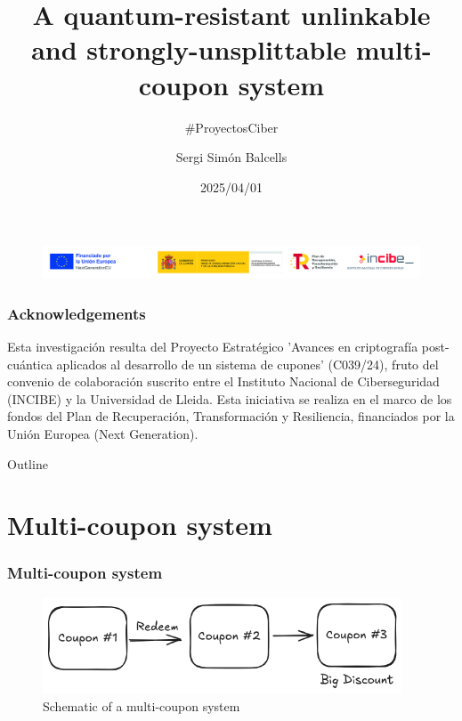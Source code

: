 \documentclass[presentation]{beamer}
\author{Sergi Simón Balcells}
\date{2025/04/01}
\title{A quantum-resistant unlinkable and strongly-unsplittable multi-coupon system}
\subtitle{\#ProyectosCiber}
\newlength\beamerleftmargin
\begin{document}
\begin{frame}
  \titlepage
  \begin{figure}
    \hspace*{-\beamerleftmargin}%
    \includegraphics[width=\paperwidth]{incibe.jpg}
  \end{figure}
\end{frame}

\begin{frame}
  \frametitle{Acknowledgements}
  Esta investigación resulta del Proyecto Estratégico 'Avances
  en criptografía post-cuántica aplicados al desarrollo
  de un sistema de cupones' (C039/24), fruto del convenio
  de colaboración suscrito entre el Instituto Nacional de
  Ciberseguridad (INCIBE) y la Universidad de Lleida. Esta
  iniciativa se realiza en el marco de los fondos del Plan de
  Recuperación, Transformación y Resiliencia, financiados
  por la Unión Europea (Next Generation).
\end{frame}


  \begin{frame}{Outline}
    \tableofcontents
  \end{frame}

\section{Multi-coupon system}

\begin{frame}
  \frametitle{Multi-coupon system}
\begin{figure}
  \begin{center}
    \includegraphics[width=0.95\textwidth]{multi-coupon}
  \end{center}
  \caption{Schematic of a multi-coupon system}\label{fig:multi-coupon}
\end{figure}
\end{frame}
\end{document}
